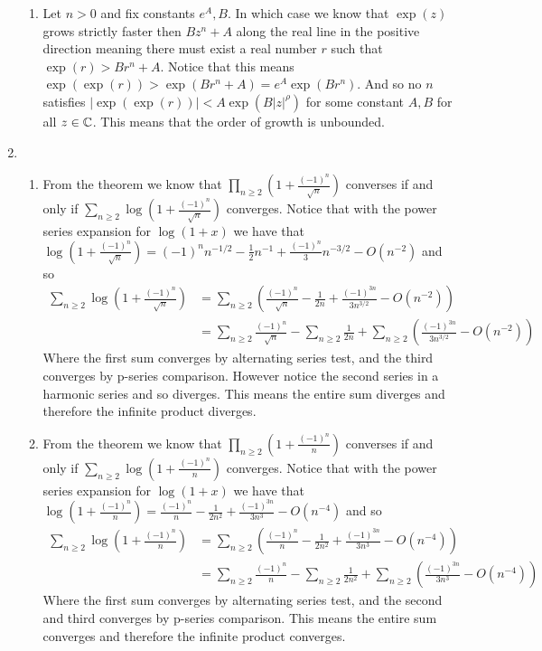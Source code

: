 \documentclass[12pt]{amsart}
\begin{document}
\begin{enumerate}
\begin{enumerate}
\item Let $n>0$ and fix constants $e^A,B$. In which case we know that $\exp(z)$ grows strictly faster then $Bz^n+A$ along the real line in the positive direction meaning there must exist a real number $r$ such that $\exp(r)>Br^n+A$. Notice that this means
$\exp({\exp(r)})>\exp(Br^n+A)=e^A\exp(Br^n)$. And so 
no $n$ satisfies $|\exp(\exp(r))|<A\exp(B|z|^\rho)$ for some constant $A,B$ for all $z\in \mathbb{C}$. This means that the order of growth is unbounded.\\ 
\end{enumerate}

\item
    \begin{enumerate}
    \item From the theorem we know that $\prod_{n\geq 2}(1+\frac{(-1)^n}{\sqrt{n}})$ converses if and only if $\sum_{n\geq 2} \log (1+\frac{(-1)^n}{\sqrt{n}})$ converges. Notice that with the power series expansion for $\log(1+x)$ we have that $\log(1+\frac{(-1)^n}{\sqrt{n}})={(-1)^nn^{-1/2}}-\frac{1}{2}n^{-1}+\frac{(-1)^{n}}{3}n^{-3/2}-O(n^{-2})$ and so
    \begin{align*}
        \sum_{n\geq 2} \log (1+\frac{(-1)^n}{\sqrt{n}})&=\sum_{n\geq 2}\left( \frac{(-1)^n}{\sqrt{n}}-\frac{1}{2n}+\frac{(-1)^{3n}}{3n^{3/2}}-O(n^{-2})\right)\\
        &=\sum_{n\geq 2} \frac{(-1)^n}{\sqrt{n}}-\sum_{n\geq 2}\frac{1}{2n}+\sum_{n\geq 2}\left(\frac{(-1)^{3n}}{3n^{3/2}}-O(n^{-2})\right)
    \end{align*}
    Where the first sum converges by alternating series test, and the third converges by p-series comparison. However notice the second series in a harmonic series and so diverges. This means the entire sum diverges and therefore the infinite product diverges.\\

    \item From the theorem we know that $\prod_{n\geq 2}(1+\frac{(-1)^n}{{n}})$ converses if and only if $\sum_{n\geq 2} \log (1+\frac{(-1)^n}{{n}})$ converges. Notice that with the power series expansion for $\log(1+x)$ we have that $\log(1+\frac{(-1)^n}{{n}})=\frac{(-1)^n}{{n}}-\frac{1}{2n^2}+\frac{(-1)^{3n}}{3n^{3}}-O(n^{-4})$ and so
    \begin{align*}
        \sum_{n\geq 2} \log (1+\frac{(-1)^n}{{n}})&=\sum_{n\geq 2} \left(\frac{(-1)^n}{{n}}-\frac{1}{2n^2}+\frac{(-1)^{3n}}{3n^{3}}-O(n^{-4})\right)\\
        &=\sum_{n\geq 2} \frac{(-1)^n}{{n}}-\sum_{n\geq 2}\frac{1}{2n^2}+\sum_{n\geq 2}\left(\frac{(-1)^{3n}}{3n^{3}}-O(n^{-4})\right)
    \end{align*}
    Where the first sum converges by alternating series test, and the second and third converges by p-series comparison. This means the entire sum converges and therefore the infinite product converges.\\
    \end{enumerate}


\end{enumerate}
\end{document}
